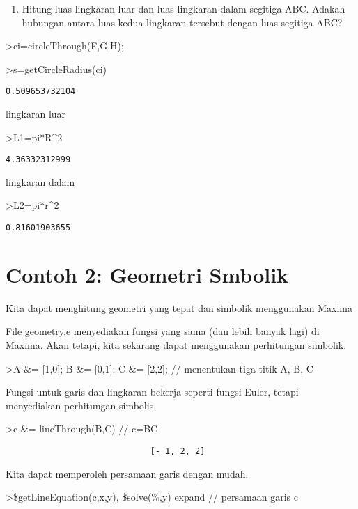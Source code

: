 \documentclass[
]{book}
\providecommand{\tightlist}{%
  \setlength{\itemsep}{0pt}\setlength{\parskip}{0pt}}
\begin{document}
\begin{enumerate}
\def\labelenumi{\arabic{enumi}.}
\setcounter{enumi}{5}
\tightlist
\item
  Hitung luas lingkaran luar dan luas lingkaran dalam segitiga ABC. Adakah hubungan antara luas kedua lingkaran tersebut dengan luas segitiga ABC?
\end{enumerate}

\textgreater ci=circleThrough(F,G,H);

\textgreater s=getCircleRadius(ci)

\begin{verbatim}
0.509653732104
\end{verbatim}

lingkaran luar

\textgreater L1=pi*R\^{}2

\begin{verbatim}
4.36332312999
\end{verbatim}

lingkaran dalam

\textgreater L2=pi*r\^{}2

\begin{verbatim}
0.81601903655
\end{verbatim}

\chapter{Contoh 2: Geometri Smbolik}\label{contoh-2-geometri-smbolik}

Kita dapat menghitung geometri yang tepat dan simbolik menggunakan Maxima

File geometry.e menyediakan fungsi yang sama (dan lebih banyak lagi) di Maxima. Akan tetapi, kita sekarang dapat menggunakan perhitungan simbolik.

\textgreater A \&= {[}1,0{]}; B \&= {[}0,1{]}; C \&= {[}2,2{]}; // menentukan tiga titik A, B, C

Fungsi untuk garis dan lingkaran bekerja seperti fungsi Euler, tetapi menyediakan perhitungan simbolis.

\textgreater c \&= lineThrough(B,C) // c=BC

\begin{verbatim}
                             [- 1, 2, 2]
\end{verbatim}

Kita dapat memperoleh persamaan garis dengan mudah.

\textgreater\$getLineEquation(c,x,y), \$solve(\%,y) \textbar{} expand // persamaan garis c
\end{document}
